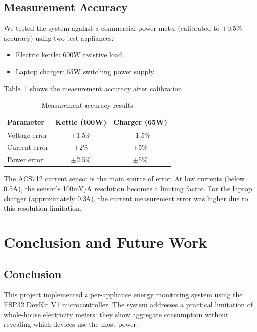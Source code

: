 \documentclass[12pt, a4paper]{article}
\begin{document}
	\subsection{Measurement Accuracy}
	
	We tested the system against a commercial power meter (calibrated to $\pm$0.5\% accuracy) using two test appliances:
	
	\begin{itemize}[itemsep=3pt, topsep=4pt]
		\item Electric kettle: 600W resistive load
		\item Laptop charger: 65W switching power supply
	\end{itemize}
	
	Table~\ref{tab:accuracy} shows the measurement accuracy after calibration.
	
	\begin{table}[H]
		\centering
		\caption{Measurement accuracy results}
		\label{tab:accuracy}
		\vspace{6pt}
		\begin{tabular}{|l|c|c|}
			\hline
			\textbf{Parameter} & \textbf{Kettle (600W)} & \textbf{Charger (65W)} \\
			\hline
			Voltage error & $\pm$1.5\% & $\pm$1.5\% \\
			\hline
			Current error & $\pm$2\% & $\pm$5\% \\
			\hline
			Power error & $\pm$2.5\% & $\pm$5\% \\
			\hline
		\end{tabular}
	\end{table}
	
	The ACS712 current sensor is the main source of error. At low currents (below 0.5A), the sensor's 100mV/A resolution becomes a limiting factor. For the laptop charger (approximately 0.3A), the current measurement error was higher due to this resolution limitation.
	
	\newpage
	
	\section{Conclusion and Future Work}
	
	\subsection{Conclusion}
	
	This project implemented a per-appliance energy monitoring system using the ESP32 DevKit V1 microcontroller. The system addresses a practical limitation of whole-house electricity meters: they show aggregate consumption without revealing which devices use the most power.
	
\end{document}
